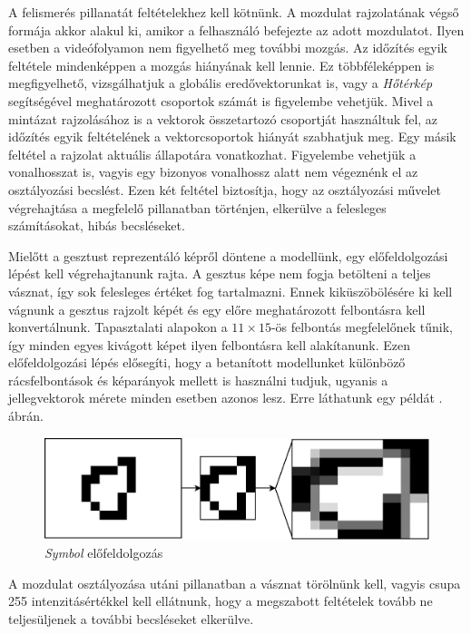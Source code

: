 A felismerés pillanatát feltételekhez kell kötnünk. A mozdulat rajzolatának végső formája akkor alakul ki, amikor a felhasználó befejezte az adott mozdulatot. Ilyen esetben a videófolyamon nem figyelhető meg további mozgás. Az időzítés egyik feltétele mindenképpen a mozgás hiányának kell lennie. Ez többféleképpen is megfigyelhető, vizsgálhatjuk a globális eredővektorunkat is, vagy a \textit{Hőtérkép} segítségével meghatározott csoportok számát is figyelembe vehetjük. Mivel a mintázat rajzolásához is a vektorok összetartozó csoportját használtuk fel, az időzítés egyik feltételének a vektorcsoportok hiányát szabhatjuk meg. Egy másik feltétel a rajzolat aktuális állapotára vonatkozhat. Figyelembe vehetjük a vonalhosszat is, vagyis egy bizonyos vonalhossz alatt nem végeznénk el az osztályozási becslést. Ezen két feltétel biztosítja, hogy az osztályozási művelet végrehajtása a megfelelő pillanatban történjen, elkerülve a felesleges számításokat, hibás becsléseket.

Mielőtt a gesztust reprezentáló képről döntene a modellünk, egy előfeldolgozási lépést kell végrehajtanunk rajta. A gesztus képe nem fogja betölteni a teljes vásznat, így sok felesleges értéket fog tartalmazni. Ennek kiküszöbölésére ki kell vágnunk a gesztus rajzolt képét és egy előre meghatározott felbontásra kell konvertálnunk. Tapasztalati alapokon a $11\times 15$-ös felbontás megfelelőnek tűnik, így minden egyes kivágott képet ilyen felbontásra kell alakítanunk. Ezen előfeldolgozási lépés elősegíti, hogy a betanított modellunket különböző rácsfelbontások és képarányok mellett is használni tudjuk, ugyanis a jellegvektorok mérete minden esetben azonos lesz. Erre láthatunk egy példát . ábrán.

\begin{figure}[h]
\centering
\includegraphics[width=\textwidth]{images/crop_resize.png}
\caption{\textit{Symbol} előfeldolgozás}
\label{fig:symbol_pre}
\end{figure}

A mozdulat osztályozása utáni pillanatban a vásznat törölnünk kell, vagyis csupa 255 intenzitásértékkel kell ellátnunk, hogy a megszabott feltételek tovább ne teljesüljenek a további becsléseket elkerülve.


